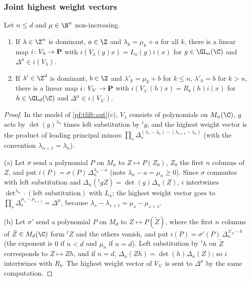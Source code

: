 \subsubsection*{Joint highest weight vectors}
\begin{lemma}\label{pf:tlift:joint}
Let $n\le d$ and $\mu\in\N^n$ non-increasing.
\begin{enumerate}[label=(\alph*),nosep]
\item If $\lambda\in\Z^n$ is dominant, $a\in\Z$ and $\lambda_k=\mu_k+a$ for all $k$, there is a linear map
  $i\colon V_\lambda\to\mathbf{P}$ with $i(V_\lambda(g)x)=L_a(g)i(x)$ for $g\in\GL_n(\C)$ and $\Delta^\mu\in i(V_\lambda)$.
\item If $\lambda'\in\Z^d$ is dominant, $b\in\Z$ and $\lambda'_k=\mu_k+b$ for $k\le n$, $\lambda'_k=b$ for $k>n$, there is a linear
  map $i\colon V_{\lambda'}\to\mathbf{P}$ with $i(V_{\lambda'}(h)x)=R_b(h)i(x)$ for $h\in\GL_d(\C)$ and $\Delta^\mu\in i(V_{\lambda'})$.
\end{enumerate}
%
\end{lemma}

\begin{proof}
In the model of \cref{pf:tlift:aut}(c), $V_\lambda$ consists of polynomials on $M_n(\C)$, $g$ acts by
$\det(g)^{\lambda_n}$ times left substitution by ${}^tg$, and the highest weight vector is the product of leading
principal minors $\prod_s\Delta_s^{(\lambda_s-\lambda_n)-(\lambda_{s+1}-\lambda_n)}$ (with the convention $\lambda_{n+1}=\lambda_n$).

(a) Let $\sigma$ send a polynomial $P$ on $M_n$ to $Z\mapsto P(Z_0)$, $Z_0$ the first $n$ columns of $Z$, and put
$i(P)=\sigma(P)\,\Delta_n^{\lambda_n-a}$ (note $\lambda_n-a=\mu_n\ge0$). Since $\sigma$ commutes with left substitution and
$\Delta_n({}^tgZ)=\det(g)\Delta_n(Z)$, $i$ intertwines $\det^{\lambda_n}\cdot(\text{left substitution})$ with $L_a$; the highest weight
vector goes to $\prod_s\Delta_s^{\mu_s-\mu_{s+1}}=\Delta^\mu$, because $\lambda_s-\lambda_{s+1}=\mu_s-\mu_{s+1}$.

(b) Let $\sigma'$ send a polynomial $P$ on $M_d$ to $Z\mapsto P(\tilde Z)$, where the first $n$ columns of
$\tilde Z\in M_d(\C)$ form ${}^tZ$ and the others vanish, and put $i(P)=\sigma'(P)\,\Delta_n^{\lambda'_d-b}$ (the exponent is $0$ if
$n<d$ and $\mu_n$ if $n=d$). Left substitution by ${}^th$ on $\tilde Z$ corresponds to $Z\mapsto Zh$, and if $n=d$,
$\Delta_n(Zh)=\det(h)\Delta_n(Z)$; so $i$ intertwines with $R_b$. The highest weight vector of $V_{\lambda'}$ is sent to
$\Delta^\mu$ by the same computation.
\end{proof}


